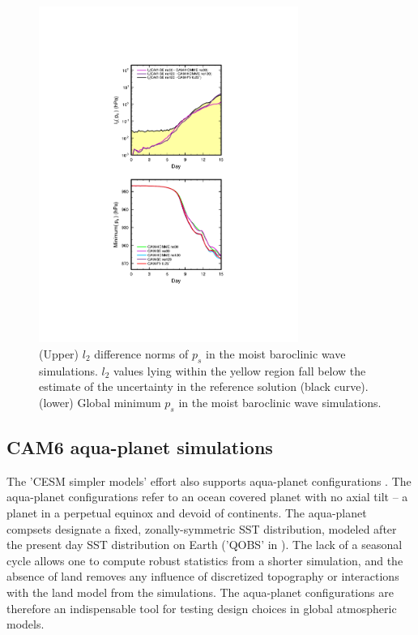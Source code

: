 \documentclass{agujournal}
\begin{document}
{\begin{figure}[h]
\centering
\includegraphics[width=20pc]{figs/l2.pdf}
\caption{(Upper) $l_2$ difference norms of $p_s$ in the moist baroclinic wave simulations. $l_2$ values lying within the yellow region fall below the estimate of the uncertainty in the reference solution (black curve). (lower) Global minimum $p_s$ in the moist baroclinic wave simulations.}
\label{fig:l2norm}
\end{figure}

\subsection{CAM6 aqua-planet simulations}\label{sec:APE}
The 'CESM simpler models' effort also supports aqua-planet configurations \citep{MWO2016JAMES}. The aqua-planet configurations \citep{NH2000ASL} refer to an ocean covered planet with no axial tilt -- a planet in a perpetual equinox and devoid of continents. The aqua-planet compsets designate a fixed, zonally-symmetric SST distribution, modeled after the present day SST distribution on Earth ('QOBS' in \cite{NH2000ASL}). The lack of a seasonal cycle allows one to compute robust statistics from a shorter simulation, and the absence of land removes any influence of discretized topography or interactions with the land model from the simulations. The aqua-planet configurations are therefore an indispensable tool for testing design choices in global atmospheric models.

}
\end{document}
